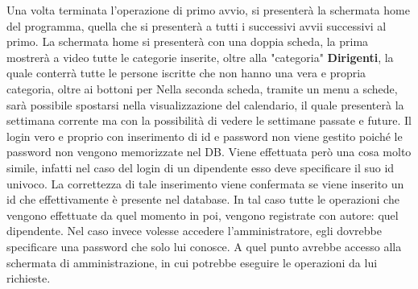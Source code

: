 \documentclass[a4paper,12pt]{report}
\begin{document}
\newpage
Una volta terminata l'operazione di primo avvio, si presenterà la schermata home del programma, quella che si presenterà a tutti i successivi
avvii successivi al primo.
La schermata home si presenterà con una doppia scheda, la prima mostrerà a video tutte le categorie inserite, oltre alla "categoria" \textbf{Dirigenti},
la quale conterrà tutte le persone iscritte che non hanno una vera e propria categoria, oltre ai bottoni per 
Nella seconda scheda, tramite un menu a schede, sarà possibile spostarsi nella visualizzazione del calendario, il quale presenterà
la settimana corrente ma con la possibilità di vedere le settimane passate e future.
Il login vero e proprio con inserimento di id e password non viene gestito poiché le password non vengono memorizzate nel DB. 
Viene effettuata però una cosa molto simile, infatti nel caso del login di un dipendente esso deve 
specificare il suo id univoco. La correttezza di tale inserimento viene confermata se viene inserito un id che 
effettivamente è presente nel database. In tal caso tutte le operazioni che vengono effettuate da quel 
momento in poi, vengono registrate con autore: quel dipendente. Nel caso invece volesse accedere 
l’amministratore, egli dovrebbe specificare una password che solo lui conosce. A quel punto avrebbe 
accesso alla schermata di amministrazione, in cui potrebbe eseguire le operazioni da lui richieste.



\end{document}
